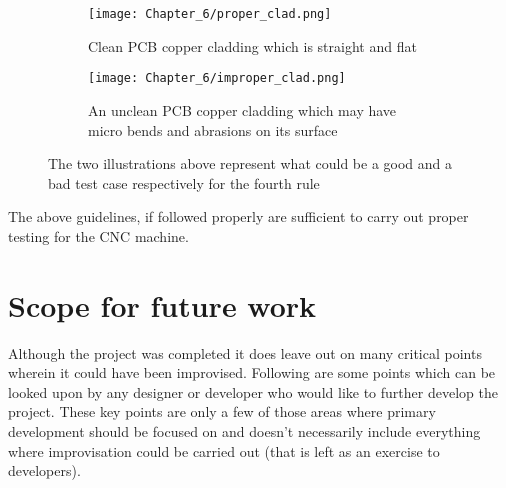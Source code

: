\begin{enumerate}
       \begin{figure}[h]

        \begin{subfigure}{0.5\textwidth}
         \hspace{8mm}
         \texttt{[image: Chapter\_6/proper\_clad.png]}
         \caption{Clean PCB copper cladding which is straight and flat}
         \label{fig:pclad}
        \end{subfigure}
        \begin{subfigure}{0.5\textwidth}
         \hspace{8mm}
         \texttt{[image: Chapter\_6/improper\_clad.png]}
         \caption{An unclean PCB copper cladding which may have micro bends and abrasions on its surface}
         \label{fig:iclad}
        \end{subfigure}

        \caption{The two illustrations above represent what could be a good and a bad test case respectively for the fourth rule}
        \label{fig:piclad}
       \end{figure}

\end{enumerate}

The above guidelines, if followed properly are sufficient to carry out proper testing for the CNC machine.

\section{Scope for future work}

Although the project was completed it does leave out on many critical points wherein it could have been improvised. Following are some points which can be looked upon by any designer or developer who would like to further develop the project. These key points are only a few of those areas where primary development should be focused on and doesn’t necessarily include everything where improvisation could be carried out (that is left as an exercise to developers).

